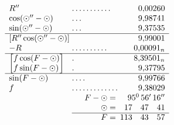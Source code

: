 \[
\begin{array}{l@{\;}l@{\;}r}
R''&\mathord{.}\,\mathord{.}\,\mathord{.}\,\mathord{.}\,\mathord{.}\,\mathord{.}\,\mathord{.}\,\mathord{.}\,\mathord{.}\,\mathord{.}\,\mathord{.}&0{,}00260\\
\cos(\odot''-\odot)&\mathord{.}\,\mathord{.}\,\mathord{.}&9{,}98741\\
\sin(\odot''-\odot)&\mathord{.}\,\mathord{.}\,\mathord{.}&9{,}37535\\\hline
[R''\cos(\odot''-\odot)]&&9{,}99001\\
-R&\mathord{.}\,\mathord{.}\,\mathord{.}\,\mathord{.}\,\mathord{.}\,\mathord{.}\,\mathord{.}\,\mathord{.}\,\mathord{.}\,\mathord{.}&0{,}00091_n\\\hline
\left[\begin{array}{@{}l@{}}f\cos(F-\odot)\\f\sin(F-\odot)\end{array}\right]&
\begin{array}{@{}l@{}}\mathord{.}\\\mathord{.}\end{array}&
\begin{array}{@{}r@{}}8{,}39501_n\\9{,}37795\end{array}\\\hline
\sin(F-\odot)&\mathord{.}\,\mathord{.}\,\mathord{.}\,\mathord{.}&9{,}99766\\
f&\mathord{.}\,\mathord{.}\,\mathord{.}\,\mathord{.}\,\mathord{.}\,\mathord{.}\,\mathord{.}\,\mathord{.}\,\mathord{.}\,\mathord{.}\,\mathord{.}\,\mathord{.}\,\mathord{.}&9{,}38029\\
\multicolumn{2}{r}{F-\odot=}&95^{0}\,56'\,16''\\
\multicolumn{2}{r}{\odot=}&17\quad47\quad41\\\cline{2-3}
\multicolumn{2}{r}{F=}&113\quad43\quad57
\end{array}
\]
